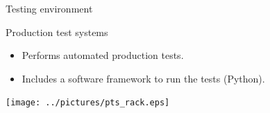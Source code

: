 \documentclass[compress,red]{beamer}
\begin{document}
\begin{frame}{Testing environment}

  \begin{block}{Production test systems}
    \begin{itemize}
    \item Performs automated production tests.
    \item Includes a software framework to run the tests (Python).
    \end{itemize}
  \end{block}

   \begin{center}
    \texttt{[image: ../pictures/pts\_rack.eps]}
  \end{center}




\end{frame}

\end{document}
